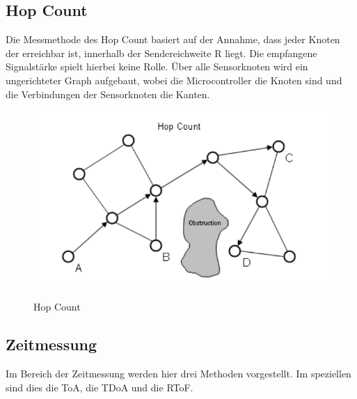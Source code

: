\subsection{Hop Count}
Die Messmethode des Hop Count basiert auf der Annahme, dass jeder Knoten der erreichbar ist, innerhalb der Sendereichweite R liegt. Die empfangene
Signalstärke spielt hierbei keine Rolle. Über alle Sensorknoten wird ein ungerichteter Graph aufgebaut, wobei die Microcontroller die Knoten sind und die Verbindungen der Sensorknoten die Kanten.
\begin{figure}
  \caption{Hop Count}
  \includegraphics[scale=0.60]{img/hop_count1}\\
\end{figure}

\subsection{Zeitmessung}
Im Bereich der Zeitmessung werden hier drei Methoden vorgestellt. Im speziellen sind dies die \ac{ToA}, die \ac{TDoA} und die \ac{RToF}.
